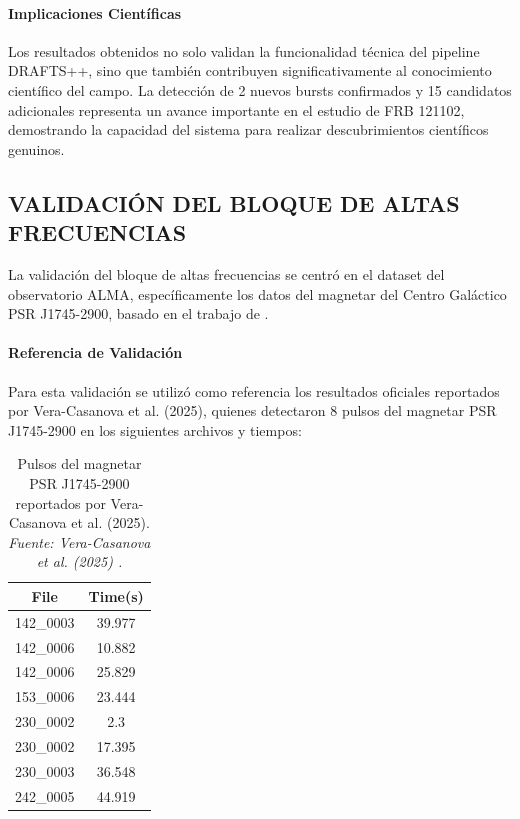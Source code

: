 \paragraph{Implicaciones Científicas}

Los resultados obtenidos no solo validan la funcionalidad técnica del pipeline DRAFTS++, sino que también contribuyen significativamente al conocimiento científico del campo. La detección de 2 nuevos bursts confirmados y 15 candidatos adicionales representa un avance importante en el estudio de FRB 121102, demostrando la capacidad del sistema para realizar descubrimientos científicos genuinos.

\subsection{VALIDACIÓN DEL BLOQUE DE ALTAS FRECUENCIAS}

La validación del bloque de altas frecuencias se centró en el dataset del observatorio ALMA, específicamente los datos del magnetar del Centro Galáctico PSR J1745-2900, basado en el trabajo de \cite{veracasanova2025}.

\paragraph{Referencia de Validación}

Para esta validación se utilizó como referencia los resultados oficiales reportados por Vera-Casanova et al. (2025), quienes detectaron 8 pulsos del magnetar PSR J1745-2900 en los siguientes archivos y tiempos:

\begin{table}[H]
    \centering
    \caption{Pulsos del magnetar PSR J1745-2900 reportados por Vera-Casanova et al. (2025). \textit{Fuente: Vera-Casanova et al. (2025) \cite{veracasanova2025}.}}
    \label{tab:veracasanova_reference}
    \begin{tabular}{|c|c|}
        \hline
        \textbf{File} & \textbf{Time(s)} \\
        \hline
        142\_0003 & 39.977 \\
        142\_0006 & 10.882 \\
        142\_0006 & 25.829 \\
        153\_0006 & 23.444 \\
        230\_0002 & 2.3 \\
        230\_0002 & 17.395 \\
        230\_0003 & 36.548 \\
        242\_0005 & 44.919 \\
        \hline
    \end{tabular}
\end{table}

